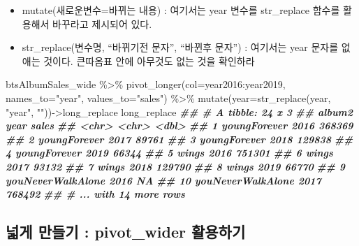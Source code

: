 \documentclass[
]{book}
\newenvironment{Shaded}{\begin{snugshade}}{\end{snugshade}}
\newcommand{\AttributeTok}[1]{\textcolor[rgb]{0.77,0.63,0.00}{#1}}
\newcommand{\DocumentationTok}[1]{\textcolor[rgb]{0.56,0.35,0.01}{\textbf{\textit{#1}}}}
\newcommand{\FunctionTok}[1]{\textcolor[rgb]{0.00,0.00,0.00}{#1}}
\newcommand{\NormalTok}[1]{#1}
\newcommand{\OtherTok}[1]{\textcolor[rgb]{0.56,0.35,0.01}{#1}}
\newcommand{\SpecialCharTok}[1]{\textcolor[rgb]{0.00,0.00,0.00}{#1}}
\newcommand{\StringTok}[1]{\textcolor[rgb]{0.31,0.60,0.02}{#1}}
\providecommand{\tightlist}{%
  \setlength{\itemsep}{0pt}\setlength{\parskip}{0pt}}
\theoremstyle{definition}
\theoremstyle{definition}
\theoremstyle{definition}
\theoremstyle{definition}
\theoremstyle{remark}
\begin{document}
\begin{itemize}
\tightlist
\item
  mutate(새로운변수=바뀌는 내용) : 여기서는 year 변수를 str\_replace 함수를 활용해서 바꾸라고 제시되어 있다.
\item
  str\_replace(변수명, ``바뀌기전 문자'', ``바뀐후 문자'') : 여기서는 year 문자를 없애는 것이다. 큰따옴표 안에 아무것도 없는 것을 확인하라
\end{itemize}

\begin{Shaded}
\begin{Highlighting}[]
\NormalTok{btsAlbumSales\_wide }\SpecialCharTok{\%\textgreater{}\%} 
  \FunctionTok{pivot\_longer}\NormalTok{(}\AttributeTok{col=}\NormalTok{year2016}\SpecialCharTok{:}\NormalTok{year2019, }\AttributeTok{names\_to=}\StringTok{"year"}\NormalTok{, }\AttributeTok{values\_to=}\StringTok{"sales"}\NormalTok{) }\SpecialCharTok{\%\textgreater{}\%} 
  \FunctionTok{mutate}\NormalTok{(}\AttributeTok{year=}\FunctionTok{str\_replace}\NormalTok{(year, }\StringTok{"year"}\NormalTok{, }\StringTok{""}\NormalTok{))}\OtherTok{{-}\textgreater{}}\NormalTok{long\_replace}
\NormalTok{long\_replace}
\DocumentationTok{\#\# \# A tibble: 24 x 3}
\DocumentationTok{\#\#    album2            year   sales}
\DocumentationTok{\#\#    \textless{}chr\textgreater{}             \textless{}chr\textgreater{}  \textless{}dbl\textgreater{}}
\DocumentationTok{\#\#  1 youngForever      2016  368369}
\DocumentationTok{\#\#  2 youngForever      2017   89761}
\DocumentationTok{\#\#  3 youngForever      2018  129838}
\DocumentationTok{\#\#  4 youngForever      2019   66344}
\DocumentationTok{\#\#  5 wings             2016  751301}
\DocumentationTok{\#\#  6 wings             2017   93132}
\DocumentationTok{\#\#  7 wings             2018  129790}
\DocumentationTok{\#\#  8 wings             2019   66770}
\DocumentationTok{\#\#  9 youNeverWalkAlone 2016      NA}
\DocumentationTok{\#\# 10 youNeverWalkAlone 2017  768492}
\DocumentationTok{\#\# \# ... with 14 more rows}
\end{Highlighting}
\end{Shaded}

\hypertarget{uxb113uxac8c-uxb9ccuxb4e4uxae30-pivot_wider-uxd65cuxc6a9uxd558uxae30}{%
\subsection{넓게 만들기 : pivot\_wider 활용하기}\label{uxb113uxac8c-uxb9ccuxb4e4uxae30-pivot_wider-uxd65cuxc6a9uxd558uxae30}}
\end{document}
